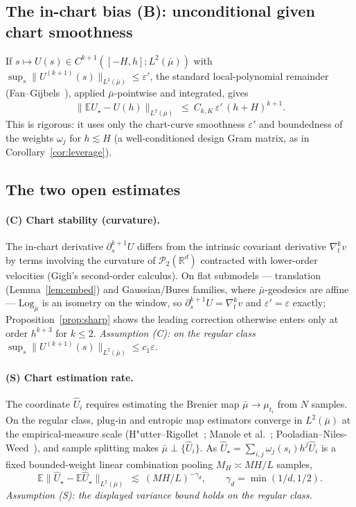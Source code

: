 \documentclass[11pt]{article}
\theoremstyle{definition}
\theoremstyle{remark}
\newcommand{\R}{\mathbb{R}}
\newcommand{\E}{\mathbb{E}}
\newcommand{\PP}{\mathcal{P}_2(\R^d)}
\begin{document}
\subsection{The in-chart bias (B): unconditional given chart smoothness}
If $s\mapsto U(s)\in C^{k+1}([-H,h];L^2(\bar\mu))$ with $\sup_s\|U^{(k+1)}(s)\|_{L^2(\bar\mu)}
\le\varepsilon'$, the standard local-polynomial remainder (Fan--Gijbels~\cite{fangijbels}), applied $\bar\mu$-pointwise
and integrated, gives
\[
   \big\|\E\hat U_\star-U(h)\big\|_{L^2(\bar\mu)}\ \le\ C_{k,K}\,\varepsilon'\,(h+H)^{k+1}.
\]
This is rigorous: it uses only the chart-curve smoothness $\varepsilon'$ and boundedness of the
weights $\omega_j$ for $h\lesssim H$ (a well-conditioned design Gram matrix, as in
Corollary~\ref{cor:leverage}).

\subsection{The two open estimates}
\paragraph{(C) Chart stability (curvature).} The in-chart derivative $\partial_s^{k+1}U$ differs
from the intrinsic covariant derivative $\nabla_t^k v$ by terms involving the curvature of $\PP$
contracted with lower-order velocities (Gigli's second-order calculus). On flat submodels ---
translation (Lemma~\ref{lem:embed}) and Gaussian/Bures families, where $\bar\mu$-geodesics are
affine --- $\mathrm{Log}_{\bar\mu}$ is an isometry on the window, so $\partial_s^{k+1}U=\nabla_t^k v$
and $\varepsilon'=\varepsilon$ exactly; Proposition~\ref{prop:sharp} shows the leading correction
otherwise enters only at order $h^{k+3}$ for $k\le2$.
\emph{Assumption (C): on the regular class $\sup_s\|U^{(k+1)}(s)\|_{L^2(\bar\mu)}\le c_1\varepsilon$.}

\paragraph{(S) Chart estimation rate.} The coordinate $\hat U_i$ requires estimating the Brenier
map $\bar\mu\to\mu_{t_i}$ from $N$ samples. On the regular class, plug-in and entropic map
estimators converge in $L^2(\bar\mu)$ at the empirical-measure scale (H"utter--Rigollet~\cite{hutter};
Manole et al.~\cite{manole}; Pooladian--Niles-Weed~\cite{pooladian}), and sample splitting makes $\bar\mu\perp\{\hat U_i\}$.
As $\hat U_\star=\sum_{i,j}\omega_j(s_i)h^j\hat U_i$ is a fixed bounded-weight linear combination
pooling $M_H\asymp MH/L$ samples,
\[
   \E\big\|\hat U_\star-\E\hat U_\star\big\|_{L^2(\bar\mu)}\ \lesssim\ (MH/L)^{-\gamma_d},
   \qquad \gamma_d=\min(1/d,1/2).
\]
\emph{Assumption (S): the displayed variance bound holds on the regular class.}
\end{document}
